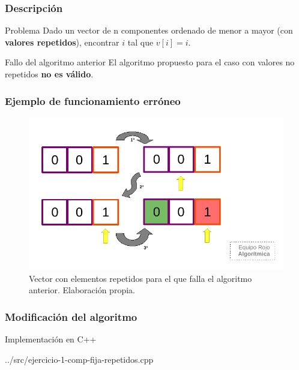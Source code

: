 \documentclass[13pt]{beamer}
\begin{document}
    \begin{frame}
        \frametitle{Descripción}
        \begin{block}{Problema}
            Dado un vector de n componentes ordenado de menor a mayor (con \textbf{valores repetidos}), 
            encontrar $i$ tal que $v[i] = i$. 
        \end{block}

        \begin{alertblock}{Fallo del algoritmo anterior}
            El algoritmo propuesto para el caso con valores no repetidos \textbf{no es válido}.
        \end{alertblock}
    \end{frame}

    \begin{frame}
        \frametitle{Ejemplo de funcionamiento erróneo}
        \begin{figure}
            \centering
            \includegraphics[scale=0.81]{img/esquema_fallo1a.pdf}
            \caption{Vector con elementos repetidos para el que falla 
            el algoritmo anterior. Elaboración propia.}
            \label{fig:fallo-1a}
        \end{figure}
    \end{frame}

    \begin{frame}
        \frametitle{Modificación del algoritmo}

        
    \end{frame}

    \begin{frame}
        \begin{exampleblock}{Implementación en C++}
            
            {../src/ejercicio-1-comp-fija-repetidos.cpp} 
        \end{exampleblock}
    \end{frame}
\end{document}
